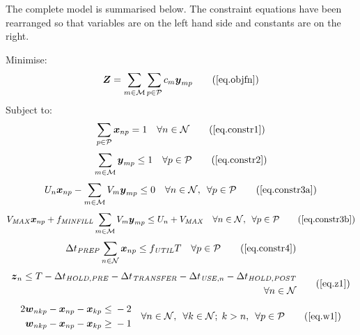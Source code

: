 The complete model is summarised below.
The constraint equations have been rearranged so that variables are on the left
hand side and constants are on the right. 

Minimise:
\begin{equation}
    \boldsymbol{Z} = \sum_{m \in \mathcal{M}} \sum_{p \in \mathcal{P}} c_m
    \boldsymbol{y}_{mp}
    \tag{\ref{eq.objfn}}
\end{equation}
Subject to:
\begin{equation}
    \sum_{p \in \mathcal{P}} \boldsymbol{x}_{np} = 1 \quad \forall n \in 
    \mathcal{N}
    \tag{\ref{eq.constr1}}
\end{equation}
\begin{equation}
    \sum_{m \in \mathcal{M}} \boldsymbol{y}_{mp} \le 1 \quad \forall p \in 
    \mathcal{P}
    \tag{\ref{eq.constr2}}
\end{equation}
\begin{equation}
    U_{n} \boldsymbol{x}_{np} - \sum_{m \in \mathcal{M}} V_{m} 
    \boldsymbol{y}_{mp} \le 0 \quad \forall n \in \mathcal{N}, \enspace 
    \forall p \in \mathcal{P}
    \tag{\ref{eq.constr3a}}
\end{equation}
\begin{equation}
    V_{\mathit{MAX}} \boldsymbol{x}_{np} + f_{\mathit{MINFILL}} 
    \sum_{m \in \mathcal{M}} V_{m} \boldsymbol{y}_{mp} \le U_{n}
    + V_{\mathit{MAX}} \quad \forall n \in \mathcal{N}, \enspace \forall p \in
    \mathcal{P}
    \tag{\ref{eq.constr3b}}
\end{equation}
\begin{equation}
    \Delta t_{\mathit{PREP}} \sum_{n \in \mathcal{N}} \boldsymbol{x}_{np} \le
    f_{\mathit{UTIL}} T \quad \forall p \in \mathcal{P}
    \tag{\ref{eq.constr4}}
\end{equation}
\begin{equation}
    \begin{aligned}
        \boldsymbol{z}_{n} \le T - \Delta t_{\mathit{HOLD,PRE}}
        - \Delta t_{\mathit{TRANSFER}} - \Delta t_{\mathit{USE},n}
        - \Delta t_{\mathit{HOLD,POST}}\\
        \quad \forall n \in \mathcal{N}
    \end{aligned}
    \tag{\ref{eq.z1}}
\end{equation}
\begin{equation}
    \begin{split}
        \begin{alignedat}{11}
            2&\boldsymbol{w}_{nkp} {}-{} &&\boldsymbol{x}_{np}
            {}-{} && \boldsymbol{x}_{kp} {}&&\le{} &{}-{} 2\\
            &\boldsymbol{w}_{nkp} {}-{} &&\boldsymbol{x}_{np}
            {}-{} && \boldsymbol{x}_{kp} {}&&\ge{} &{}-{} 1\\
        \end{alignedat}
    \end{split}
    \quad
    \begin{split}
        \forall n \in \mathcal{N}, \enspace \forall k \in \mathcal{N}; \; 
        k > n, \enspace \forall p \in \mathcal{P}
    \end{split}
    \tag{\ref{eq.w1}}
\end{equation}
